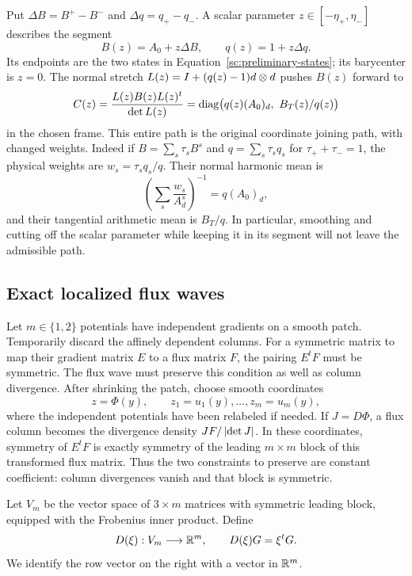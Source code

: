 Put $\Delta B=B^+-B^-$ and $\Delta q=q_+-q_-$. A scalar parameter
$z\in[-\eta_+,\eta_-]$ describes the segment
\begin{equation}
 \label{sc:synchronized-segment}
 B(z)=A_0+z\Delta B,\qquad q(z)=1+z\Delta q.
\end{equation}
Its endpoints are the two states in
Equation~\eqref{sc:preliminary-states}; its barycenter is $z=0$.
The normal stretch
$L(z)=I+(q(z)-1)d\otimes d$ pushes $B(z)$ forward to
\begin{equation}
 \label{sc:predicted-matrix}
 C(z)=\frac{L(z)B(z)L(z)^t}{\det L(z)}
      =\operatorname{diag}\bigl(q(z)(A_0)_d,\ B_T(z)/q(z)\bigr)
\end{equation}
in the chosen frame. This entire path is the original coordinate
joining path, with changed weights. Indeed if
$B=\sum_s\tau_s B^s$ and $q=\sum_s\tau_s q_s$ for
$\tau_++\tau_-=1$, the physical weights are
$w_s=\tau_s q_s/q$. Their normal harmonic mean is
\[
 \left(\sum_s\frac{w_s}{A_d^s}\right)^{-1}
 =q(A_0)_d,
\]
and their tangential arithmetic mean is $B_T/q$.
In particular, smoothing and cutting off the scalar parameter while
keeping it in its segment will not leave the admissible path.

\subsection{Exact localized flux waves}

Let $m\in\{1,2\}$ potentials have independent gradients on a
smooth patch. Temporarily discard the affinely dependent columns.
For a symmetric matrix to map their gradient matrix $E$ to a flux
matrix $F$, the pairing $E^tF$ must be symmetric. The flux wave must
preserve this condition as well as column divergence.
After shrinking the patch, choose smooth coordinates
\[
 z=\Phi(y),\qquad z_1=u_1(y),\ldots,z_m=u_m(y),
\]
where the independent potentials have been relabeled if needed.
If $J=D\Phi$, a flux column becomes the divergence density
$J F/\left\lvert \det J\right\rvert$. In these coordinates, symmetry of $E^tF$
is exactly symmetry of the leading $m\times m$ block of this
transformed flux matrix. Thus the two constraints to preserve are
constant coefficient: column divergences vanish and that block is
symmetric.

Let $V_m$ be the vector space of $3\times m$ matrices with symmetric
leading block, equipped with the Frobenius inner product. Define
\[
 D(\xi):V_m\longrightarrow\mathbb R^m,\qquad D(\xi)G=\xi^tG.
\]
We identify the row vector on the right with a vector in $\mathbb R^m$.

